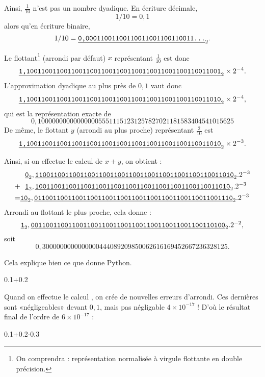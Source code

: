 Ainsi, $\frac{1}{10}$ n'est pas un nombre dyadique.  En écriture décimale, 
$$1/10 = 0,1$$ 
alors qu'en écriture binaire, 
$$1/10 = \underline{\text{\texttt{0,00011001100110011001100110011...}}}_{2}.$$

Le flottant\footnote{On comprendra : représentation normalisée à virgule flottante en double précision.} (arrondi par défaut) $x$ représentant $\frac{1}{10}$ est donc
\begin{equation*}
 \underline{\text{\texttt{1,1001100110011001100110011001100110011001100110011001}}}_{2}\times 2^{-4}.
\end{equation*}
L'approximation dyadique au plus près de $0,1$ vaut donc
\begin{equation*}
 \underline{\text{\texttt{1,1001100110011001100110011001100110011001100110011010}}}_{2}\times 2^{-4},
\end{equation*}
qui est la représentation exacte de
\begin{equation*}
 0,1000000000000000055511151231257827021181583404541015625 
\end{equation*}
De même, le flottant $y$ (arrondi au plus proche) représentant
$\frac{2}{10}$ est
\begin{equation*}
 \underline{\text{\texttt{1,1001100110011001100110011001100110011001100110011010}}}_{2}\times 2^{-3} .
\end{equation*}

Ainsi, si on effectue le calcul de $x+y$, on obtient :
\small
\begin{align*}
&~~\underline{\text{\texttt{0}}}_{2},  \underline{\text{\texttt{11001100110011001100110011001100110011001100110011010}}}_{2}.
2^{-3}\\
+&~~\underline{\text{\texttt{1}}}_{2}, \underline{\text{\texttt{1001100110011001100110011001100110011001100110011010}}}_{2}.2^{-3}\\
=&\underline{\text{\texttt{10}}}_{2},\underline{\text{\texttt{01100110011001100110011001100110011001100110011001110}}}_{2}.
2^{-3}
\end{align*}
\normalsize
Arrondi au flottant le plus proche, cela donne :
\begin{equation*}
\underline{\text{\texttt{1}}}_{2},  \underline{\text{\texttt{0011001100110011001100110011001100110011001100110100}}}_{2}.2^{-2},
\end{equation*}
soit
\begin{equation*}
0,3000000000000000444089209850062616169452667236328125.
\end{equation*}

Cela explique bien ce que donne Python.
\begin{pyconsole}
0.1+0.2
\end{pyconsole}
Quand on effectue le calcul , on crée de nouvelles erreurs d'arrondi. Ces dernières sont «négligeables» devant $0,1$, mais pas négligable $4\times 10^{-17}$ !
D'où le résultat final de l'ordre de $6\times 10^{-17}$ : 
\begin{pyconsole}
0.1+0.2-0.3
\end{pyconsole}


